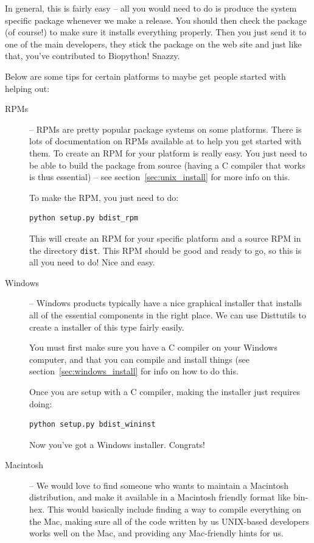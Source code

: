 \documentclass{report}
\begin{document}
In general, this is fairly easy -- all you would need to do is produce the system specific package whenever we make a release. You should then check the package (of course!) to make sure it installs everything properly. Then you just send it to one of the main developers, they stick the package on the web site and just like that, you've contributed to Biopython! Snazzy.


Below are some tips for certain platforms to maybe get people started with helping out:

\begin{description}
  \item[RPMs] -- RPMs are pretty popular package systems on some platforms. There is lots of documentation on RPMs available at  to help you get started with them. To create an RPM for your platform is really easy. You just need to be able to build the package from source (having a C compiler that works is thus essential) -- see section~\ref{sec:unix_install} for more info on this.


To make the RPM, you just need to do:

\begin{verbatim}
python setup.py bdist_rpm
\end{verbatim}

This will create an RPM for your specific platform and a source RPM in the directory \verb|dist|. This RPM should be good and ready to go, so this is all you need to do! Nice and easy.

\item[Windows] -- Windows products typically have a nice graphical installer that installs all of the essential components in the right place. We can use Disttutils to create a installer of this type fairly easily.


You must first make sure you have a C compiler on your Windows computer, and that you can compile and install things (see section~\ref{sec:windows_install} for info on how to do this.


Once you are setup with a C compiler, making the installer just requires doing:

\begin{verbatim}
python setup.py bdist_wininst
\end{verbatim}

Now you've got a Windows installer. Congrats!

\item[Macintosh] -- We would love to find someone who wants to maintain a Macintosh distribution, and make it available in a Macintosh friendly format like bin-hex. This would basically include finding a way to compile everything on the Mac, making sure all of the code written by us UNIX-based developers works well on the Mac, and providing any Mac-friendly hints for us.

\end{description}
\end{document}

